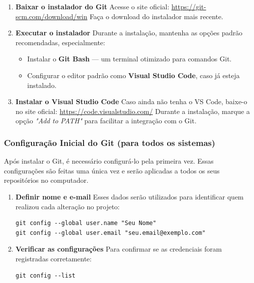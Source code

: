 \begin{enumerate}
    \item \textbf{Baixar o instalador do Git}  
    Acesse o site oficial:  
    \url{https://git-scm.com/download/win}  
    Faça o download do instalador mais recente.

    \item \textbf{Executar o instalador}  
    Durante a instalação, mantenha as opções padrão recomendadas, especialmente:
    \begin{itemize}
        \item Instalar o \textbf{Git Bash} — um terminal otimizado para comandos Git.
        \item Configurar o editor padrão como \textbf{Visual Studio Code}, caso já esteja instalado.
    \end{itemize}

    \item \textbf{Instalar o Visual Studio Code}  
    Caso ainda não tenha o VS Code, baixe-o no site oficial:  
    \url{https://code.visualstudio.com/}  
    Durante a instalação, marque a opção \textit{"Add to PATH"} para facilitar a integração com o Git.
\end{enumerate}

\subsubsection*{Configuração Inicial do Git (para todos os sistemas)}

Após instalar o Git, é necessário configurá-lo pela primeira vez. Essas configurações são feitas uma única vez e serão aplicadas a todos os seus repositórios no computador.

\begin{enumerate}
    \item \textbf{Definir nome e e-mail}  
    Esses dados serão utilizados para identificar quem realizou cada alteração no projeto:
    \begin{lstlisting}[style=shellstyle]
git config --global user.name "Seu Nome"
git config --global user.email "seu.email@exemplo.com"
    \end{lstlisting}

    \item \textbf{Verificar as configurações}  
    Para confirmar se as credenciais foram registradas corretamente:
    \begin{lstlisting}[style=shellstyle]
git config --list
    \end{lstlisting}
\end{enumerate}

